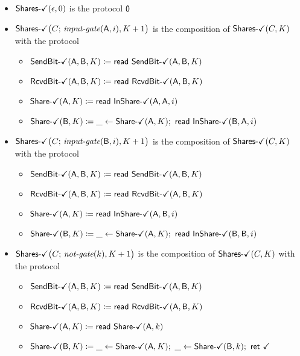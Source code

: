\begin{itemize}
\item $\SharesOk(\epsilon,0)$ is the protocol $\zero$

\item $\SharesOk\big(C; \, \inputgate(\A,i),K+1\big)$ is the composition of $\SharesOk(C,K)$ with the protocol
\begin{itemize}
\item {\color{teal} $\SendBitOk(\A,\B,K) \coloneqq \read{\SendBitOk(\A,\B,K)}$}
\item {\color{teal} $\RcvdBitOk(\A,\B,K) \coloneqq \read{\RcvdBitOk(\A,\B,K)}$}
\item {\color{teal} $\ShareOk(\A,K) \coloneqq \read{\InShareOk(\A,\A,i)}$}
\item {\color{teal} $\ShareOk(\B,K) \coloneqq \_ \leftarrow \ShareOk(\A,K); \ \read{\InShareOk(\B,\A,i)}$}
\end{itemize}

\item $\SharesOk\big(C; \, \inputgate(\B,i),K+1\big)$ is the composition of $\SharesOk(C,K)$ with the protocol
\begin{itemize}
\item {\color{teal} $\SendBitOk(\A,\B,K) \coloneqq \read{\SendBitOk(\A,\B,K)}$}
\item {\color{teal} $\RcvdBitOk(\A,\B,K) \coloneqq \read{\RcvdBitOk(\A,\B,K)}$}
\item {\color{teal} $\ShareOk(\A,K) \coloneqq \read{\InShareOk(\A,\B,i)}$}
\item {\color{teal} $\ShareOk(\B,K) \coloneqq \_ \leftarrow \ShareOk(\A,K); \ \read{\InShareOk(\B,\B,i)}$}
\end{itemize}

\item $\SharesOk\big(C; \, \notgate(k),K+1\big)$ is the composition of $\SharesOk(C,K)$ with the protocol
\begin{itemize}
\item {\color{teal} $\SendBitOk(\A,\B,K) \coloneqq \read{\SendBitOk(\A,\B,K)}$}
\item {\color{teal} $\RcvdBitOk(\A,\B,K) \coloneqq \read{\RcvdBitOk(\A,\B,K)}$}
\item {\color{teal} $\ShareOk(\A,K) \coloneqq \read{\ShareOk(\A,k)}$}
\item {\color{teal} $\ShareOk(\B,K) \coloneqq \_ \leftarrow \ShareOk(\A,K); \ \_ \leftarrow \ShareOk(\B,k); \ \ret{\checkmark}$}
\end{itemize}


\end{itemize}
